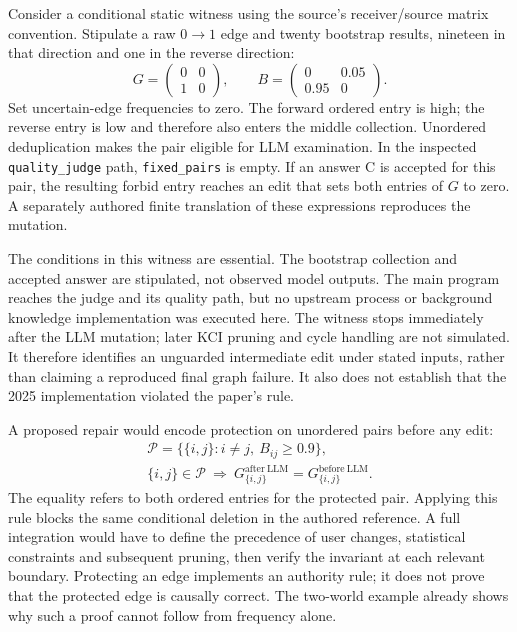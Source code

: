 Consider a conditional static witness using the source's receiver/source
matrix convention. Stipulate a raw $0\to1$ edge and twenty bootstrap results,
nineteen in that direction and one in the reverse direction:
\begin{equation}
 G=\begin{pmatrix}0&0\\1&0\end{pmatrix},\qquad
 B=\begin{pmatrix}0&0.05\\0.95&0\end{pmatrix}.
 \label{exec17:copilot-edit-input}
\end{equation}
Set uncertain-edge frequencies to zero. The forward ordered entry is high;
the reverse entry is low and therefore also enters the middle collection.
Unordered deduplication makes the pair eligible for LLM examination. In the
inspected \texttt{quality\_judge} path, \texttt{fixed\_pairs} is empty. If an
answer C is accepted for this pair, the resulting forbid entry reaches an edit
that sets both entries of $G$ to zero. A separately authored finite translation
of these expressions reproduces the mutation.
\citep{exec17_copilot_code,exec17_copilot_exact}

The conditions in this witness are essential. The bootstrap collection and
accepted answer are stipulated, not observed model outputs. The main program
reaches the judge and its quality path, but no upstream process or background
knowledge implementation was executed here. The witness stops immediately
after the LLM mutation; later KCI pruning and cycle handling are not simulated.
It therefore identifies an unguarded intermediate edit under stated inputs,
rather than claiming a reproduced final graph failure. It also does not
establish that the 2025 implementation violated the paper's rule.
\citep{exec17_copilot_code,exec17_copilot_exact}

A proposed repair would encode protection on unordered pairs before any edit:
\begin{equation}
 \begin{gathered}
 \mathcal P=\{\{i,j\}:i\ne j,\ B_{ij}\ge0.9\},\\
 \{i,j\}\in\mathcal P\ \Longrightarrow\
 G^{\mathrm{after\ LLM}}_{\{i,j\}}=G^{\mathrm{before\ LLM}}_{\{i,j\}}.
 \end{gathered}
 \label{exec17:copilot-guard}
\end{equation}
The equality refers to both ordered entries for the protected pair. Applying
this rule blocks the same conditional deletion in the authored reference.
A full integration would have to define the precedence of user changes,
statistical constraints and subsequent pruning, then verify the invariant at
each relevant boundary. Protecting an edge implements an authority rule; it
does not prove that the protected edge is causally correct. The two-world
example already shows why such a proof cannot follow from frequency alone.
\citep{exec17_copilot_exact}

